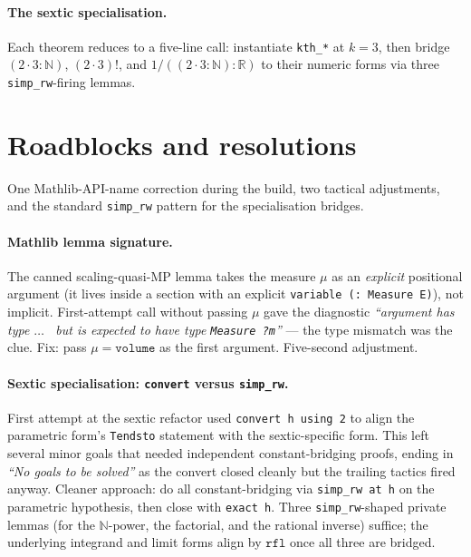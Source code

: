 \documentclass[11pt]{article}
\begin{document}
\paragraph{The sextic specialisation.} Each theorem reduces to a
five-line call: instantiate \texttt{kth\_*} at $k = 3$, then bridge
$(2 \cdot 3 : \mathbb N)$, $(2 \cdot 3)!$, and $1/((2 \cdot 3 : \mathbb N) : \mathbb R)$
to their numeric forms via three \texttt{simp\_rw}-firing lemmas.

\section{Roadblocks and resolutions}

One Mathlib-API-name correction during the build, two tactical
adjustments, and the standard \texttt{simp\_rw} pattern for the
specialisation bridges.

\paragraph{Mathlib lemma signature.}
The canned scaling-quasi-MP lemma takes the measure $\mu$ as an
\emph{explicit} positional argument (it lives inside a section with
an explicit \texttt{variable (\mu : Measure E)}), not implicit.
First-attempt call without passing $\mu$ gave the diagnostic
\emph{``argument has type \texttt{$\dots$ } but is expected to
have type \texttt{Measure ?m}''} --- the type mismatch was the
clue. Fix: pass $\mu = \texttt{volume}$ as the first argument.
Five-second adjustment.

\paragraph{Sextic specialisation: \texttt{convert} versus
\texttt{simp\_rw}.} First attempt at the sextic refactor used
\texttt{convert h using 2} to align the parametric form's
\texttt{Tendsto} statement with the sextic-specific form. This
left several minor goals that needed independent constant-bridging
proofs, ending in \emph{``No goals to be solved''} as the convert
closed cleanly but the trailing tactics fired anyway. Cleaner
approach: do all constant-bridging via \texttt{simp\_rw at h} on the
parametric hypothesis, then close with \texttt{exact h}. Three
\texttt{simp\_rw}-shaped private lemmas
(for the $\mathbb N$-power, the factorial, and the rational inverse)
suffice; the underlying integrand and limit forms align by
$\texttt{rfl}$ once all three are bridged.
\end{document}
